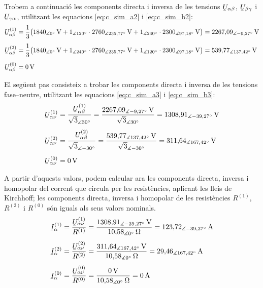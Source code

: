 \begin{exemple}
Trobem a continuaci\'{o} les components directa i inversa de les
tensions $\cmplx{U}_{\alpha\beta}$, $\cmplx{U}_{\beta\gamma}$ i
$\cmplx{U}_{\gamma\alpha}$, utilitzant les equacions
\eqref{eq:c_sim_a2} i \eqref{eq:c_sim_b2}:
\begin{align*}
\cmplx{U}_{\alpha\beta}\ap{(1)} &= \frac{1}{3} \big(
1840_{\measuredangle 0\degree}\unit{V} + 1_{\measuredangle
120\degree} \cdot 2760_{\measuredangle 235{,}77\degree}\unit{V} +
1_{\measuredangle 240\degree} \cdot 2300_{\measuredangle
97{,}18\degree}\unit{V} \big) = 2267{,}09_{\measuredangle -9{,}27\degree}\unit{V} \\[1ex]
\cmplx{U}_{\alpha\beta}\ap{(2)} &= \frac{1}{3} \big(
1840_{\measuredangle 0\degree}\unit{V} + 1_{\measuredangle
240\degree} \cdot 2760_{\measuredangle 235{,}77\degree}\unit{V} +
1_{\measuredangle 120\degree} \cdot 2300_{\measuredangle
97{,}18\degree}\unit{V} \big) = 539{,}77_{\measuredangle
137{,}42\degree}\unit{V} \\[1ex]
\cmplx{U}_{\alpha\beta}\ap{(0)} &= 0\unit{V}
\end{align*}

El seg\"{u}ent pas consisteix a trobar les components directa i inversa
de les tensions fase--neutre, utilitzant les equacions
\eqref{eq:c_sim_a3} i \eqref{eq:c_sim_b3}:
\begin{align*}
\cmplx{U}_{\alpha\nu}\ap{(1)} &=
\frac{\cmplx{U}_{\alpha\beta}\ap{(1)}}{\sqrt{3}_{\measuredangle
30\degree}} = \frac{2267{,}09_{\measuredangle
-9{,}27\degree}\unit{V}}{\sqrt{3}_{\measuredangle
30\degree}} = 1308{,}91_{\measuredangle -39{,}27\degree}\unit{V} \\[1ex]
\cmplx{U}_{\alpha\nu}\ap{(2)} &=
\frac{\cmplx{U}_{\alpha\beta}\ap{(2)}}{\sqrt{3}_{\measuredangle
-30\degree}} = \frac{539{,}77_{\measuredangle
137{,}42\degree}\unit{V}}{\sqrt{3}_{\measuredangle -30\degree}} =
311{,}64_{\measuredangle 167{,}42\degree}\unit{V} \\[1ex]
\cmplx{U}_{\alpha\nu}\ap{(0)} &= 0\unit{V}
\end{align*}

A partir d'aquests valors, podem calcular ara les components
directa, inversa i homopolar del corrent que circula per les
resist\`{e}ncies, aplicant les lleis de Kirchhoff; les components
directa, inversa i homopolar de les resist\`{e}ncies $R^{(1)}$,
$R^{(2)}$ i $R^{(0)}$ s\'{o}n iguals als seus valors nominals.
\begin{align*}
\cmplx{I}_\alpha\ap{(1)} &=
\frac{\cmplx{U}_{\alpha\nu}\ap{(1)}}{R^{(1)}} =
\frac{1308{,}91_{\measuredangle
-39{,}27\degree}\unit{V}}{10{,}58_{\measuredangle 0 \degree}
\unit{\ohm}} =
123{,}72_{\measuredangle -39{,}27\degree}\unit{A} \\[1ex]
\cmplx{I}_\alpha\ap{(2)} &=
\frac{\cmplx{U}_{\alpha\nu}\ap{(2)}}{R^{(2)}} =
\frac{311{,}64_{\measuredangle
167{,}42\degree}\unit{V}}{10{,}58_{\measuredangle 0 \degree}
\unit{\ohm}} = 29{,}46_{\measuredangle 167{,}42\degree}\unit{A} \\[1ex]
\cmplx{I}_\alpha\ap{(0)} &=
\frac{\cmplx{U}_{\alpha\nu}\ap{(0)}}{R^{(0)}} =
\frac{0\unit{V}}{10{,}58_{\measuredangle 0 \degree}\unit{\ohm}} =
0\unit{A}
\end{align*}


\end{exemple}
